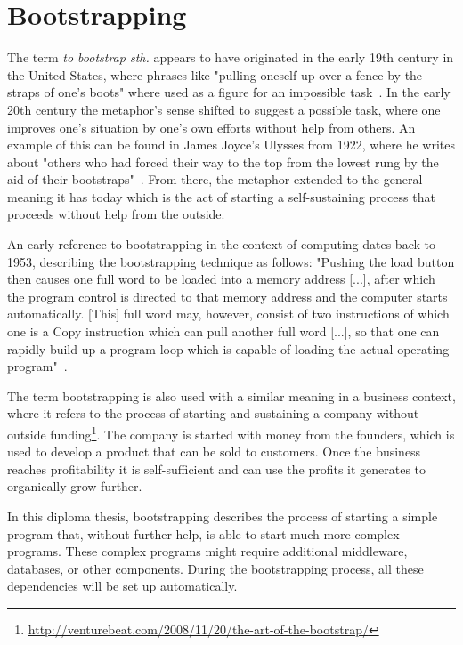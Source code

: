 \section{Bootstrapping}
\label{fundamentals:bootstrapping}

The term \textit{to bootstrap sth.} appears to have originated in the early 19th century in the United States, where phrases like "pulling oneself up over a fence by the straps of one's boots" where used as a figure for an impossible task~\autocite{bootstrap:history}.
In the early 20th century the metaphor's sense shifted to suggest a possible task, where one improves one's situation by one's own efforts without help from others.
An example of this can be found in James Joyce's Ulysses from 1922, where he writes about "others who had forced their way to the top from the lowest rung by the aid of their bootstraps"~\autocite{bootstrap:ulysses}.
From there, the metaphor extended to the general meaning it has today which is the act of starting a self-sustaining process that proceeds without help from the outside.

An early reference to bootstrapping in the context of computing dates back to 1953, describing the bootstrapping technique as follows: "Pushing the load button then causes one full word to be loaded into a memory address [...], after which the program control is directed to that memory address and the computer starts automatically. [This] full word may, however, consist of two instructions of which one is a Copy instruction which can pull another full word [...], so that one can rapidly build up a program loop which is capable of loading the actual operating program"~\autocite{bootstrap:early}.

The term bootstrapping is also used with a similar meaning in a business context, where it refers to the process of starting and sustaining a company without outside funding\footnote{\url{http://venturebeat.com/2008/11/20/the-art-of-the-bootstrap/}}.
The company is started with money from the founders, which is used to develop a product that can be sold to customers.
Once the business reaches profitability it is self-sufficient and can use the profits it generates to organically grow further.

In this diploma thesis, bootstrapping describes the process of starting a simple program that, without further help, is able to start much more complex programs.
These complex programs might require additional middleware, databases, or other components.
During the bootstrapping process, all these dependencies will be set up automatically.
